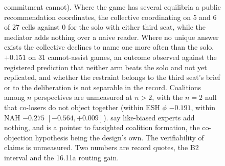 \begin{figure}[p]
{commitment cannot). Where the game has several equilibria a public
recommendation coordinates, the collective coordinating on 5 and 6 of 27 cells
against 0 for the solo with either third seat, while the mediator adds nothing
over a naive reader. Where no unique answer exists the collective declines to
name one more often than the solo, $+0.151$ on 31 cannot-assist games, an
outcome observed against the registered prediction that neither arm beats the
solo and not yet replicated, and whether the restraint belongs to the third
seat's brief or to the deliberation is not separable in the record. Coalitions
among $n$ perspectives are unmeasured at $n > 2$, with the $n = 2$ null that
co-losers do not object together (within ESH $\phi$ $-0.191$, within NAH
$-0.275$ $[-0.564, +0.009]$). \citet{krishna2001model} say like-biased experts
add nothing, and \citet{chwe1994farsighted} is a pointer to farsighted
coalition formation, the co-objection hypothesis being the design's own. The
verifiability of claims \citep{okunofujiwara1990strategic, glazer2004optimal}
is unmeasured. Two numbers are record quotes, the B2 interval and the 16.11a
routing gain.}
\label{fig-g6-taxonomy}
\end{figure}

